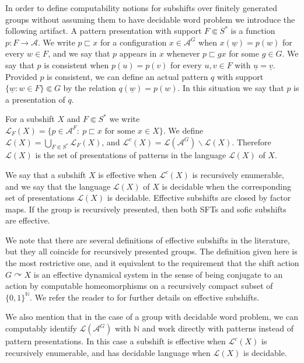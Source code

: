 \documentclass[a4paper,oneside]{amsart}
\renewcommand{\(}{\begin{dmath*}}
\renewcommand{\)}{\end{dmath*}}
\theoremstyle{definition}
\newcommand{\N}{\mathbb{N}}
\newcommand{\Le}{\mathcal{L}}
\newcommand{\Lep}{\mathscr{L}}
\newcommand{\A}{\mathcal{A}}
\begin{document}
In order to define computability notions for subshifts over  finitely generated groups without assuming them to have decidable word problem we introduce the following artifact. A pattern presentation with support $F\Subset S^\ast$ is a function $p\colon F\to \A$. We write $p\sqsubset x$ for a configuration  $x\in \A^G$ when $x(\underline{w})=p(w)$ for every $w\in F$, and we say that $p$ appears in $x$ whenever $p\sqsubset gx$ for some $g\in G$. We say that $p$  is consistent when $p(u)=p(v)$ for every $u,v\in F$ with $\underline{u}=\underline{v}$. Provided $p$ is consistent, we can define an actual pattern $q$ with support $\{\underline{w} : w\in F\}\Subset G$ by the relation $q(\underline{w})=p(w)$. In this situation we say that $p$ is a presentation of $q$.   
 
For a subshift $X$ and  $F\Subset S^\ast$ we write $\mathscr{L}_F(X)=\{ p \in \A^F : \  p\sqsubset x \text{ for some } x\in X\}$. We define $\Lep(X)=\bigcup_{F\Subset S^\ast}\Lep_F(X)$, and  $\Lep^c(X)=\Lep(\A^G)\smallsetminus \Lep(X)$.  Therefore $\Lep(X)$ is the set of presentations of patterns in the language $\Le(X)$ of $X$. 

We say that a subshift $X$  is effective when $\Lep^c(X)$ is recursively enumerable, and we say that the language $\Le(X)$ of $X$ is decidable when the corresponding set of presentations $\Lep(X)$ is decidable. Effective subshifts are closed by factor maps. If the group is recursively presented, then both SFTs and sofic subshifts are effective. 

We note that there are several definitions of effective subshifts in the literature, but they all coincide for recursively presented groups. The definition given here is the most restrictive one, and it equivalent to the requirement that the shift action $G\curvearrowright X$  is an effective dynamical system in the sense of being conjugate to an action by computable homeomorphisms on a recursively compact subset of $\{0,1\}^\N$. We refer the reader to  \cite[\S 7]{barbieri_effective_2025} for further details on effective subshifts. 

We also mention that in the case of a group with decidable word problem, we can computably identify $\Le(\A^G)$ with $\N$ and work directly with patterns instead of pattern presentations. In this case a subshift is effective when $\Le^c(X)$ is recursively enumerable, and has decidable language when $\Le(X)$ is decidable.

\end{document}
